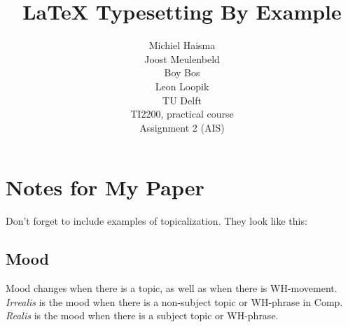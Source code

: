 \documentclass[12pt]{article}
\title{LaTeX Typesetting By Example}
\author{Michiel Haisma\\
Joost Meulenbeld\\
Boy Bos\\
Leon Loopik\\
TU Delft\\
TI2200, practical course\\
Assignment 2 (AIS)}
\begin{document}
\maketitle

\section*{Notes for My Paper}

Don't forget to include examples of topicalization.
They look like this:

\subsection*{Mood}

Mood changes when there is a topic, as well as when
there is WH-movement.  \emph{Irrealis} is the mood when
there is a non-subject topic or WH-phrase in Comp.
\emph{Realis} is the mood when there is a subject topic
or WH-phrase.
\end{document}
